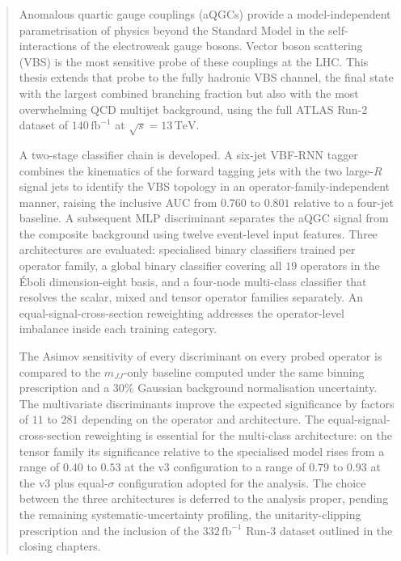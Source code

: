 \documentclass[11pt]{report}
\begin{document}
\begin{abstract}
\thispagestyle{plain}
\noindent Anomalous quartic gauge couplings (aQGCs) provide a model-independent parametrisation of physics beyond the Standard Model in the self-interactions of the electroweak gauge bosons. Vector boson scattering (VBS) is the most sensitive probe of these couplings at the LHC. This thesis extends that probe to the fully hadronic VBS channel, the final state with the largest combined branching fraction but also with the most overwhelming QCD multijet background, using the full ATLAS Run-2 dataset of $140\,\mathrm{fb}^{-1}$ at $\sqrt{s}=13\,\mathrm{TeV}$.

A two-stage classifier chain is developed. A six-jet VBF-RNN tagger combines the kinematics of the forward tagging jets with the two large-$R$ signal jets to identify the VBS topology in an operator-family-independent manner, raising the inclusive AUC from $0.760$ to $0.801$ relative to a four-jet baseline. A subsequent MLP discriminant separates the aQGC signal from the composite background using twelve event-level input features. Three architectures are evaluated: specialised binary classifiers trained per operator family, a global binary classifier covering all $19$ operators in the Éboli dimension-eight basis, and a four-node multi-class classifier that resolves the scalar, mixed and tensor operator families separately. An equal-signal-cross-section reweighting addresses the operator-level imbalance inside each training category.

The Asimov sensitivity of every discriminant on every probed operator is compared to the $m_{JJ}$-only baseline computed under the same binning prescription and a $30\%$ Gaussian background normalisation uncertainty. The multivariate discriminants improve the expected significance by factors of $11$ to $281$ depending on the operator and architecture. The equal-signal-cross-section reweighting is essential for the multi-class architecture: on the tensor family its significance relative to the specialised model rises from a range of $0.40$ to $0.53$ at the v3 configuration to a range of $0.79$ to $0.93$ at the v3 plus equal-$\sigma$ configuration adopted for the analysis. The choice between the three architectures is deferred to the analysis proper, pending the remaining systematic-uncertainty profiling, the unitarity-clipping prescription and the inclusion of the $332\,\mathrm{fb}^{-1}$ Run-3 dataset outlined in the closing chapters.
\end{abstract}
\end{document}
